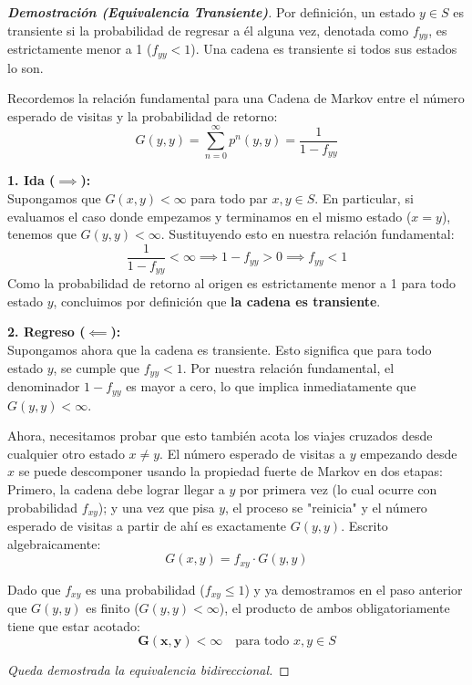 \documentclass[10pt,a4paper]{article}
\begin{document}
\vspace{5mm}

\begin{proof}[\textbf{Demostración (Equivalencia Transiente)}]
    Por definición, un estado $y \in S$ es transiente si la probabilidad de regresar a él alguna vez, denotada como $f_{yy}$, es estrictamente menor a 1 ($f_{yy} < 1$). Una cadena es transiente si todos sus estados lo son.
    
    Recordemos la relación fundamental para una Cadena de Markov entre el número esperado de visitas y la probabilidad de retorno:
    $$ G(y,y) = \sum_{n=0}^\infty p^n(y,y) = \frac{1}{1 - f_{yy}} $$
    
    \textbf{1. Ida ($\implies$):} \\
    Supongamos que $G(x,y) < \infty$ para todo par $x,y \in S$.
    En particular, si evaluamos el caso donde empezamos y terminamos en el mismo estado ($x=y$), tenemos que $G(y,y) < \infty$.
    Sustituyendo esto en nuestra relación fundamental:
    $$ \frac{1}{1 - f_{yy}} < \infty \implies 1 - f_{yy} > 0 \implies f_{yy} < 1 $$
    Como la probabilidad de retorno al origen es estrictamente menor a 1 para todo estado $y$, concluimos por definición que \textbf{la cadena es transiente}.
    
    \vspace{3mm}
    \textbf{2. Regreso ($\impliedby$):} \\
    Supongamos ahora que la cadena es transiente. Esto significa que para todo estado $y$, se cumple que $f_{yy} < 1$.
    Por nuestra relación fundamental, el denominador $1 - f_{yy}$ es mayor a cero, lo que implica inmediatamente que $G(y,y) < \infty$.
    
    Ahora, necesitamos probar que esto también acota los viajes cruzados desde cualquier otro estado $x \neq y$. 
    El número esperado de visitas a $y$ empezando desde $x$ se puede descomponer usando la propiedad fuerte de Markov en dos etapas: 
    Primero, la cadena debe lograr llegar a $y$ por primera vez (lo cual ocurre con probabilidad $f_{xy}$); y una vez que pisa $y$, el proceso se "reinicia" y el número esperado de visitas a partir de ahí es exactamente $G(y,y)$.
    Escrito algebraicamente:
    $$ G(x,y) = f_{xy} \cdot G(y,y) $$
    
    Dado que $f_{xy}$ es una probabilidad ($f_{xy} \le 1$) y ya demostramos en el paso anterior que $G(y,y)$ es finito ($G(y,y) < \infty$), el producto de ambos obligatoriamente tiene que estar acotado:
    $$ \mathbf{G(x,y) < \infty} \quad \text{para todo } x,y \in S $$
    
    \textit{Queda demostrada la equivalencia bidireccional.}
\end{proof}
\end{document}
